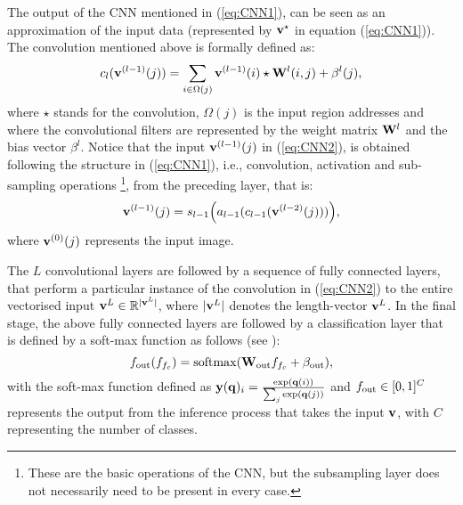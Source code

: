 \documentclass[5p,time]{elsarticle}
\begin{document}
The output of the CNN mentioned in (\ref{eq:CNN1}), can be seen as an approximation of the input data (represented by
${\bf v}^{\star}$ in equation (\ref{eq:CNN1})). The convolution mentioned above is formally defined as:
\begin{equation}
c_{l}({\bf v}^{(l-1)}(j)) = \sum_{i\in\Omega(j)} {\bf v}^{(l-1)}(i) \star {\bf W}^{l}(i,j) + \beta^{l}(j),\label{eq:CNN2}
\end{equation}
where $\star$ stands for the convolution, $\Omega(j)$ is the input region addresses and where the convolutional filters are represented by the weight matrix ${\bf W}^l$ and the bias vector $\beta^l$.
Notice that the input ${\bf v}^{(l-1)}(j)$ in (\ref{eq:CNN2}), is obtained following the structure in (\ref{eq:CNN1}), i.e., convolution, activation and sub-sampling operations \footnote{These are the basic operations of the CNN, but the subsampling layer does not necessarily need to be present in every case.}, from the preceding layer, that is:
\begin{equation}{\bf v}^{(l-1)}(j) = s_{l-1}\Bigl(a_{l-1}(c_{l-1}({\bf v}^{(l-2)}(j) ))\Bigr),
\end{equation}
where ${\bf v}^{(0)}(j)$  represents the input image.

The $L$ convolutional layers are followed by a sequence of fully
connected layers, that perform a particular instance of the
convolution in (\ref{eq:CNN2}) to the entire vectorised input ${\bf
	v}^L\in\mathbb{R}^{|{\bf v}^L|}$, where $|{\bf v}^L|$ denotes the
length-vector ${\bf v}^L$. In the final stage, the above fully
connected layers are followed by a classification layer that is
defined by a soft-max function as follows (see
\cite{KrizhevskyNIPS2012}):
\begin{equation}
f_{\rm out}(f_{{f_c}}) = {\rm softmax}({\bf W}_{\rm out} f_{{f_c}} + \beta_{\rm out}), \label{eq:out}
\end{equation}
with the soft-max function defined as  ${\bf y}({\bf
	q})_i=\frac{\exp({{\bf q}}(i))}{\sum_j \exp({{\bf q}}(j))}$ and
$f_{\rm out}\in[0,1]^C$ represents the output from the inference
process that takes the input ${\bf v}$, with $C$ representing the
number of classes.
\end{document}
